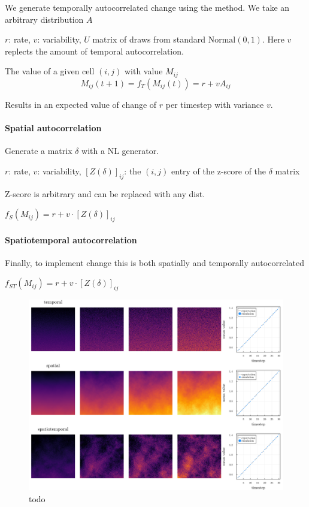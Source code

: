 \documentclass[11pt]{article}
\makeatletter
\def\maxwidth{\ifdim\Gin@nat@width>\linewidth\linewidth
\else\Gin@nat@width\fi}
\let\Oldincludegraphics\includegraphics
\renewcommand{\includegraphics}[1]{\Oldincludegraphics[width=\maxwidth]{#1}}
\makeatother
\begin{document}
We generate temporally autocorrelated change using the method. We take
an arbitrary distribution \(A\)

\(r\): rate, \(v\): variability, \(U\) matrix of draws from standard
\(\text{Normal}(0,1)\). Here \(v\) replects the amount of temporal
autocorrelation.

The value of a given cell \((i,j)\) with value \(M_{ij}\)
\[M_{ij}(t+1) = f_{T}(M_{ij}(t)) = r + vA_{ij}\]

Results in an expected value of change of \(r\) per timestep with
variance \(v\).

\hypertarget{spatial-autocorrelation}{%
\paragraph{Spatial autocorrelation}\label{spatial-autocorrelation}}

Generate a matrix \(\delta\) with a NL generator.

\(r\): rate, \(v\): variability, \([Z(\delta)]_{ij}\): the \((i,j)\)
entry of the z-score of the \(\delta\) matrix

Z-score is arbitrary and can be replaced with any dist.

\(f_{S}(M_{ij}) = r + v \cdot [Z(\delta)]_{ij}\)

\hypertarget{spatiotemporal-autocorrelation}{%
\paragraph{Spatiotemporal
autocorrelation}\label{spatiotemporal-autocorrelation}}

Finally, to implement change this is both spatially and temporally
autocorrelated

\(f_{ST}(M_{ij}) = r + v \cdot [Z(\delta)]_{ij}\)

\begin{figure}
\centering
\includegraphics{./figures/temporal.png}
\caption{todo}
\end{figure}
\end{document}
